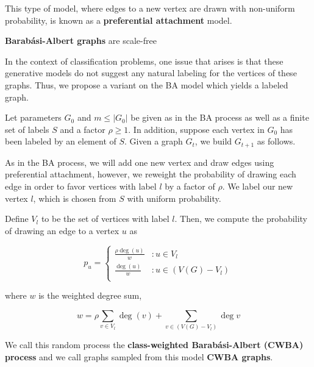 This type of model, where edges to a new vertex are drawn with non-uniform
probability, is known as a \textbf{preferential attachment} model.

\begin{theorem}
  \textbf{Barab\'asi-Albert graphs} are scale-free
\end{theorem}

In the context of classification problems, one issue that arises is that these
generative models do not suggest any natural labeling for the vertices of these
graphs. Thus, we propose a variant on the BA model which yields a labeled graph.

\begin{definition}
  Let parameters $G_0$ and $m \leq |G_0|$ be given as in the BA process as well
  as a finite set of labels $S$ and a factor $\rho \ge 1$. In addition, suppose
  each vertex in $G_0$ has been labeled by an element of $S$. Given a graph
  $G_t$, we build $G_{t+1}$ as follows.

  As in the BA process, we will add one new vertex and draw edges using
  preferential attachment, however, we reweight the probability of drawing each
  edge in order to favor vertices with label $l$ by a factor of $\rho$. We label
  our new vertex $l$, which is chosen from $S$ with uniform probability.

  Define $V_l$ to be the set of vertices with label $l$. Then, we compute the
  probability of drawing an edge to a vertex $u$ as

  \[
    p_u = \begin{cases}
      \frac{\rho\deg(u)}{w} &: u \in V_l\\
      
      \frac{\deg(u)}{w} &: u \in (V(G) - V_l)\\
    \end{cases}
  \]

  where $w$ is the weighted degree sum,

  \[
    w = \rho \sum_{v \in V_l}\deg(v) + \sum_{v \in (V(G) - V_l)}\deg{v}
  \]

  We call this random process the \textbf{class-weighted Barab\'asi-Albert
    (CWBA) process} and we call graphs sampled from this model \textbf{CWBA
    graphs}.
\end{definition}


